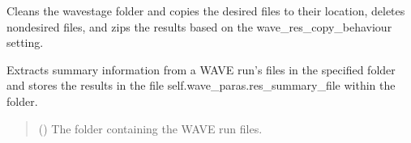 \documentclass[letterpaper,10pt,english]{sphinxmanual}
\begin{document}
\begin{fulllineitems}
\begin{fulllineitems}
\begin{quote}
\begin{description}
\end{description}\end{quote}

\end{fulllineitems}


\begin{fulllineitems}
\label{\detokenize{API:wavepy.postprocess_wave_files.PostprocessWaveFiles.edit_wave_results}}
\pysigstartsignatures
{}
\pysigstopsignatures
\sphinxAtStartPar
Cleans the wave\sphinxhyphen{}stage folder and copies the desired files to their location,
deletes non\sphinxhyphen{}desired files, and zips the results based on the wave\_res\_copy\_behaviour setting.

\end{fulllineitems}


\begin{fulllineitems}
\label{\detokenize{API:wavepy.postprocess_wave_files.PostprocessWaveFiles.extract_summary}}
\pysigstartsignatures
{}
\pysigstopsignatures
\sphinxAtStartPar
Extracts summary information from a WAVE run’s files in the specified folder
and stores the results in the file self.wave\_paras.res\_summary\_file within the folder.
\begin{quote}\begin{description}
\sphinxAtStartPar
{} () \textendash{} The folder containing the WAVE run files.

\end{description}\end{quote}

\end{fulllineitems}


\end{fulllineitems}
\end{document}
